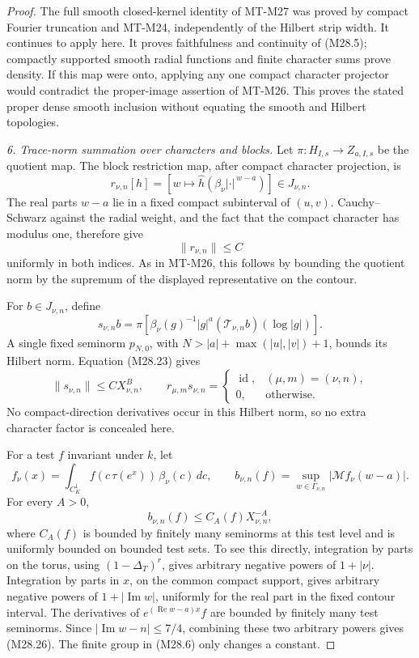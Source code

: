 \begin{proof}
The full smooth closed-kernel identity of
MT-M27 was proved by compact Fourier
truncation and MT-M24, independently of
the Hilbert strip width. It continues to
apply here. It proves faithfulness and
continuity of (M28.5); compactly supported
smooth radial functions and finite
character sums prove density. If this
map were onto, applying any one compact
character projector would contradict
the proper-image assertion of MT-M26.
This proves the stated proper dense
smooth inclusion without equating
the smooth and Hilbert topologies.

\emph{6. Trace-norm summation over characters and blocks.}
Let \(\pi:H_{I,s}\to Z_{a,I,s}\) be the quotient map.
The block restriction map, after compact
character projection, is
\[
  r_{\nu,n}[h]
       =\left[w\longmapsto
          \widehat h(\beta_\nu|\cdot|^{\,w-a})\right]
           \in J_{\nu,n}.
 \]
The real parts \(w-a\) lie in a fixed compact
subinterval of \((u,v)\). Cauchy--Schwarz
against the radial weight, and the fact
that the compact character has modulus
one, therefore give
\[
                \|r_{\nu,n}\|\le C                         \tag{M28.24}
\]
uniformly in both indices. As in MT-M26,
this follows by bounding the quotient
norm by the supremum of the displayed
representative on the contour.

For \(b\in J_{\nu,n}\), define
\[
  s_{\nu,n}b
       =\pi\left[
          \beta_\nu(g)^{-1}|g|^a
               (\mathcal T_{\nu,n}b)(\log|g|)
              \right].
 \]
A single fixed seminorm \(p_{N,0}\), with
\(N>|a|+\max(|u|,|v|)+1\), bounds its
Hilbert norm. Equation (M28.23) gives
\[
 \|s_{\nu,n}\|\le C X_{\nu,n}^B,\qquad
 r_{\mu,m}s_{\nu,n}
      =\begin{cases}\operatorname{id},&(\mu,m)=(\nu,n),\\
                      0,&\text{otherwise}.
        \end{cases}                                          \tag{M28.25}
\]
No compact-direction derivatives occur
in this Hilbert norm, so no extra
character factor is concealed here.

For a test \(f\) invariant under \(k\), let
\[
 f_\nu(x)=\int_{C_K^1}
          f(c\,\tau(e^x))\,\beta_\nu(c)\,dc,\qquad
 b_{\nu,n}(f)=
       \sup_{w\in\Gamma_{\nu,n}}
                      |\mathcal M f_\nu(w-a)|.
 \]
For every \(A>0\),
\[
                   b_{\nu,n}(f)\le C_A(f)X_{\nu,n}^{-A},       \tag{M28.26}
\]
where \(C_A(f)\) is bounded by finitely
many seminorms at this test level and
is uniformly bounded on bounded test
sets. To see this directly, integration
by parts on the torus, using
\((1-\Delta_T)^r\), gives arbitrary
negative powers of \(1+|\nu|\).
Integration by parts in \(x\), on the
common compact support, gives arbitrary
negative powers of \(1+|\operatorname{Im}w|\),
uniformly for the real part in the
fixed contour interval. The derivatives
of \(e^{(\operatorname{Re}w-a)x}f\)
are bounded by finitely many test
seminorms. Since
\(|\operatorname{Im}w-n|\le7/4\),
combining these two arbitrary powers
gives (M28.26). The finite group in
(M28.6) only changes a constant.


\end{proof}
